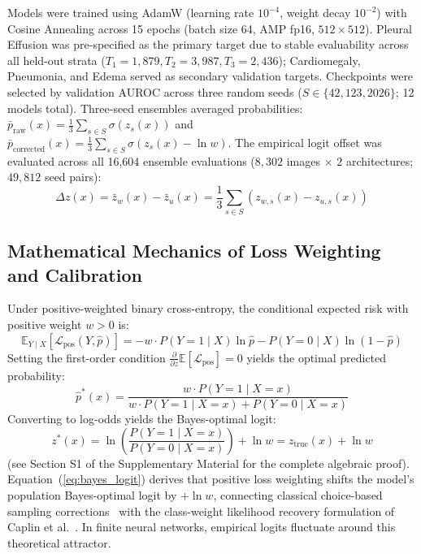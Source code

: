 \documentclass[preprint,12pt]{elsarticle}
\begin{document}
Models were trained using AdamW (learning rate $10^{-4}$, weight decay $10^{-2}$) with Cosine Annealing across 15 epochs (batch size 64, AMP fp16, $512 \times 512$). Pleural Effusion was pre-specified as the primary target due to stable evaluability across all held-out strata ($T_1=1,879, T_2=3,987, T_3=2,436$); Cardiomegaly, Pneumonia, and Edema served as secondary validation targets. Checkpoints were selected by validation AUROC across three random seeds ($S \in \{42, 123, 2026\}$; 12 models total). Three-seed ensembles averaged probabilities: $\bar{p}_{\text{raw}}(x) = \frac{1}{3}\sum_{s \in S} \sigma(z_s(x))$ and $\bar{p}_{\text{corrected}}(x) = \frac{1}{3}\sum_{s \in S} \sigma(z_s(x) - \ln w)$. The empirical logit offset was evaluated across all 16,604 ensemble evaluations ($8,302$ images $\times$ $2$ architectures; $49,812$ seed pairs):
\begin{equation}
\Delta z(x) = \bar{z}_w(x) - \bar{z}_u(x) = \frac{1}{3}\sum_{s \in S} \left( z_{w, s}(x) - z_{u, s}(x) \right)
\label{eq:delta_z_definition}
\end{equation}

\subsection{Mathematical Mechanics of Loss Weighting and Calibration}
Under positive-weighted binary cross-entropy, the conditional expected risk with positive weight $w > 0$ is:
\begin{equation}
\mathbb{E}_{Y \mid X} [\mathcal{L}_{\text{pos}}(Y, \hat{p})] = - w \cdot P(Y=1 \mid X) \ln \hat{p} - P(Y=0 \mid X) \ln(1 - \hat{p})
\end{equation}
Setting the first-order condition $\frac{\partial}{\partial z} \mathbb{E}[\mathcal{L}_{\text{pos}}] = 0$ yields the optimal predicted probability:
\begin{equation}
\hat{p}^*(x) = \frac{w \cdot P(Y=1 \mid X=x)}{w \cdot P(Y=1 \mid X=x) + P(Y=0 \mid X=x)}
\end{equation}
Converting to log-odds yields the Bayes-optimal logit:
\begin{equation}
z^*(x) = \ln\left(\frac{P(Y=1 \mid X=x)}{P(Y=0 \mid X=x)}\right) + \ln w = z_{\text{true}}(x) + \ln w
\label{eq:bayes_logit}
\end{equation}
(see Section S1 of the Supplementary Material for the complete algebraic proof). Equation~(\ref{eq:bayes_logit}) derives that positive loss weighting shifts the model's population Bayes-optimal logit by $+\ln w$, connecting classical choice-based sampling corrections~\cite{king2001logistic} with the class-weight likelihood recovery formulation of Caplin et al.~\cite{caplin2022calibrating}. In finite neural networks, empirical logits fluctuate around this theoretical attractor.
\end{document}
